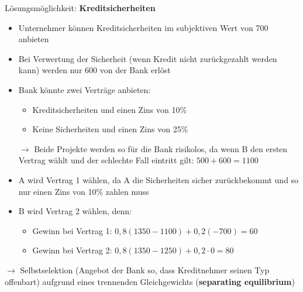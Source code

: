 Lösungsmöglichkeit: \textbf{Kreditsicherheiten}
\begin{itemize}
	\item Unternehmer können Kreditsicherheiten im subjektiven Wert von 700 anbieten
	\item Bei Verwertung der Sicherheit (wenn Kredit nicht zurückgezahlt werden kann) werden nur 600 von der Bank erlöst
	\item Bank könnte zwei Verträge anbieten:
	\begin{itemize}
		\item Kreditsicherheiten und einen Zins von 10\%
		\item Keine Sicherheiten und einen Zins von 25\%
	\end{itemize}
	$\rightarrow$ Beide Projekte werden so für die Bank risikolos, da wenn B den ersten Vertrag wählt und der schlechte Fall eintritt gilt: $500+600=1100$
	\item A wird Vertrag 1 wählen, da A die Sicherheiten sicher zurückbekommt und so nur einen Zins von 10\% zahlen muss
	\item B wird Vertrag 2 wählen, denn:
	\begin{itemize}
		\item Gewinn bei Vertrag 1: $0,8(1350-1100)+0,2(-700)=60$
		\item Gewinn bei Vertrag 2: $0,8(1350-1250)+0,2\cdot 0=80$
	\end{itemize}
\end{itemize}

$\rightarrow$ Selbstselektion (Angebot der Bank so, dass Kreditnehmer seinen Typ offenbart) aufgrund eines trennenden Gleichgewichts (\textbf{separating equilibrium})\\



